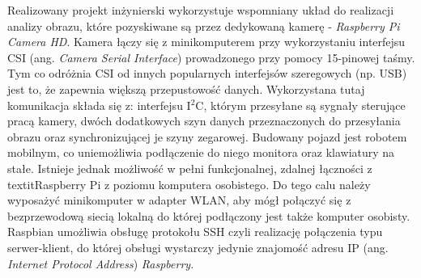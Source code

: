 Realizowany projekt inżynierski wykorzystuje wspomniany układ do realizacji analizy obrazu, które pozyskiwane są przez dedykowaną kamerę - \textit{Raspberry Pi Camera HD}. Kamera łączy się z minikomputerem przy wykorzystaniu interfejsu CSI (ang. \textit{Camera Serial Interface}) prowadzonego przy pomocy 15-pinowej taśmy. Tym co odróżnia CSI od innych popularnych interfejsów szeregowych (np. USB) jest to, że zapewnia większą przepustowość danych. Wykorzystana tutaj komunikacja składa się z: interfejsu I$^2$C, którym przesyłane są sygnały sterujące pracą kamery, dwóch dodatkowych szyn danych przeznaczonych do przesyłania obrazu oraz synchronizującej je szyny zegarowej. 
Budowany pojazd jest robotem mobilnym, co uniemożliwia podłączenie do niego monitora oraz klawiatury na stałe. Istnieje jednak możliwość w pełni funkcjonalnej, zdalnej łączności z textit{Raspberry Pi} z poziomu komputera osobistego. Do tego calu należy wyposażyć minikomputer w adapter WLAN, aby mógł połączyć się z bezprzewodową siecią lokalną do której podłączony jest także komputer osobisty. Raspbian umożliwia obsługę protokołu SSH  czyli realizację połączenia typu serwer-klient, do której obsługi wystarczy jedynie znajomość adresu IP (ang. \textit{Internet Protocol Address}) \textit{Raspberry}.
  
